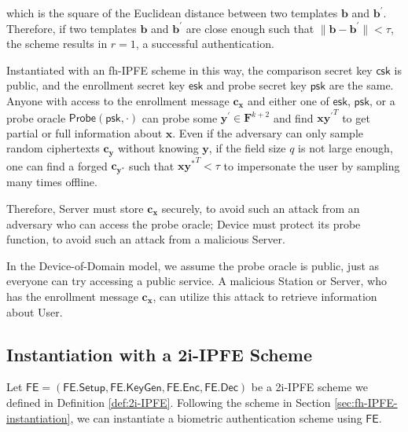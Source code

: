 which is the square of the Euclidean distance between two templates $\mathbf{b}$ and $\mathbf{b}^\prime$. Therefore, if two templates $\mathbf{b}$ and $\mathbf{b}^\prime$ are close enough such that $\|\mathbf{b} - \mathbf{b}^\prime\| < \tau$, the scheme results in $r = 1$, a successful authentication.


Instantiated with an fh-IPFE scheme in this way, the comparison secret key $\textsf{csk}$ is public, and the enrollment secret key $\textsf{esk}$ and probe secret key $\textsf{psk}$ are the same. Anyone with access to the enrollment message $\mathbf{c_x}$ and either one of $\textsf{esk}$, $\textsf{psk}$, or a probe oracle $\textsf{Probe}(\textsf{psk}, \cdot )$ can probe some $\mathbf{y}^{\prime} \in \mathbf{F}^{k+2}$ and find $\mathbf{x} {\mathbf{y}^\prime}^T$ to get partial or full information about $\mathbf{x}$. Even if the adversary can only sample random ciphertexts $\mathbf{c_{y}}$ without knowing $\mathbf{y}$, if the field size $q$ is not large enough, one can find a forged $\mathbf{c_{y^*}}$ such that $\mathbf{x}\mathbf{y^*}^T < \tau$ to impersonate the user by sampling many times offline.

Therefore, \textsf{Server} must store $\mathbf{c_x}$ securely, to avoid such an attack from an adversary who can access the probe oracle; \textsf{Device} must protect its probe function, to avoid such an attack from a malicious \textsf{Server}. 

In the Device-of-Domain model, we assume the probe oracle is public, just as everyone can try accessing a public service. A malicious \textsf{Station} or \textsf{Server}, who has the enrollment message $\mathbf{c_x}$, can utilize this attack to retrieve information about \textsf{User}.




\subsection{Instantiation with a 2i-IPFE Scheme}
\label{sec:2i-IPFE-instantiation}

Let $\textsf{FE} = (\textsf{FE.Setup}, \textsf{FE.KeyGen}, \textsf{FE.Enc}, \textsf{FE.Dec})$ be a 2i-IPFE scheme we defined in Definition \ref{def:2i-IPFE}. Following the scheme in Section \ref{sec:fh-IPFE-instantiation}, we can instantiate a biometric authentication scheme using $\textsf{FE}$.

